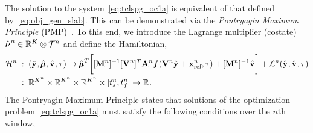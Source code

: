 The solution to the system~\eqref{eq:tclspg_oc1a} is equivalent of that defined by~\eqref{eq:obj_gen_slab}. 
This can be demonstrated via the \textit{Pontryagin Maximum Principle} (PMP)~\cite{optimal_control_book}. To this end, we introduce the Lagrange multiplier (costate) 
$\adjointOCArgnt{n} \in \RR{\romdim} \otimes \timeSpaceArg{n}$ and define the Hamiltonian, 
\begin{equation}\label{eq:hamiltonian}
\begin{split}
\hamiltonianArg{n} \; &: \;  (\genstateyDiscreteArgnt{},\adjointDiscreteDumArgnt{},\controllerDiscreteDumArgnt{},\timeDummy) \mapsto 
 \adjointDiscreteDumArgnt{T} \bigg[  [\massArg{n}]^{-1}\basisspaceTArg{n} \stweightingMatArgt{n}{t}\velocity(\basisspaceArg{n} \genstateyDiscreteArgnt{} + \stateInterceptArg{n},\timeDummy) + [\massArg{n}]^{-1}\controllerDiscreteDumArgnt{} \bigg] +  \objectiveControlArg{n}(\genstateyDiscreteArgnt{},\controllerDiscreteDumArgnt{},\timeDummy) \\
&: \; \RR{\romdimArg{n}} \times \RR{\romdimArg{n}} \times \RR{\romdimArg{n}} \times [\timeStartArg{n},\timeEndArg{n}] \rightarrow \RR{}.
\end{split}
\end{equation} 
The Pontryagin Maximum Principle states that solutions of the optimization problem~\eqref{eq:tclspg_oc1a} must satisfy the 
following conditions over the $n$th window,
